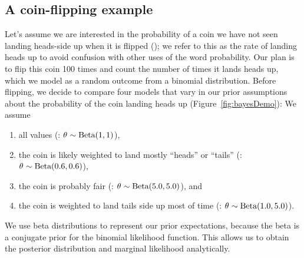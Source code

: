\subsection{A coin-flipping example}

Let's assume we are interested in the probability of a coin we have not seen
landing heads-side up when it is flipped (\probheads);
we refer to this as the rate of landing heads up to avoid confusion with other
uses of the word probability.
Our plan is to flip this coin 100 times and count the number of times it lands
heads up, which we model as a random outcome from a binomial distribution.
Before flipping, we decide to compare four models that vary in our prior
assumptions about the probability of the coin landing heads up
(Figure~\ref{fig:bayesDemo}):
We assume
\begin{enumerate}
    \item all values 
        (\coinmodel[1]: $\theta_{} \sim \textrm{Beta}(1, 1)$),
    \item the coin is likely weighted to land mostly ``heads'' or ``tails''
        (\coinmodel[2]: $\theta_{} \sim \textrm{Beta}(0.6, 0.6)$),
    \item the coin is probably fair
        (\coinmodel[3]: $\theta_{} \sim \textrm{Beta}(5.0, 5.0)$), and
    \item the coin is weighted to land tails side up most of time
        (\coinmodel[4]: $\theta_{} \sim \textrm{Beta}(1.0, 5.0)$).
\end{enumerate}
We use beta distributions to represent our prior expectations, because the
beta is a conjugate prior for the binomial likelihood function.
This allows us to obtain the posterior distribution and marginal likelihood
analytically.


